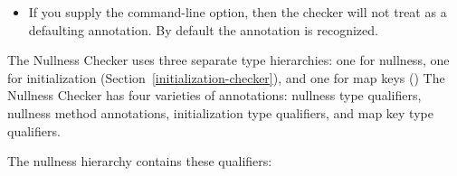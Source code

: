 \begin{enumerate}
\begin{itemize}
\item
  \label{nullness-jspecifyNullMarkedAlias}%
  If you supply the  command-line option, then the
  checker will not treat  as a defaulting
  annotation. By default the  annotation is recognized.
\end{itemize}

\end{enumerate}



The Nullness Checker uses three separate type hierarchies:  one for nullness,
one for initialization (Section~\ref{initialization-checker}),
and one for map keys ()
The Nullness Checker has four varieties of annotations:  nullness
type qualifiers, nullness method annotations, initialization type qualifiers, and
map key type
qualifiers.


The nullness hierarchy contains these qualifiers:

